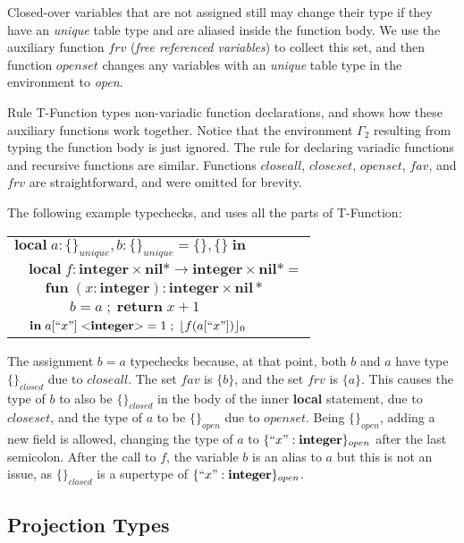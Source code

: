 \documentclass[10pt]{sigplanconf}
\newcommand{\Nil}{\mathbf{nil}}
\newcommand{\Integer}{\mathbf{integer}}
\newcommand{\Void}{\Nil{*}}
\newcommand{\env}{\Gamma}
\begin{document}
Closed-over variables that are not assigned still may
change their type if they have an {\em unique} table type
and are aliased inside the function body. We use the auxiliary
function $frv$ ({\em free referenced variables}) to collect
this set, and then function $openset$ changes any variables
with an {\em unique} table type in the environment to {\em open}.

Rule {\sc T-Function} types non-variadic function declarations,
and shows how these auxiliary functions work together.
Notice that the environment $\env_{2}$ resulting from
typing the function body is just ignored. The rule for
declaring variadic functions and recursive functions are
similar. Functions $closeall$, $closeset$, $openset$, $fav$,
and $frv$ are straightforward, and were omitted for brevity.

The following example typechecks, and uses all the parts of {\sc T-Function}:
{\small
\begin{center}
\begin{tabular}{llll}
\multicolumn{4}{l}{$\mathbf{local} \; a:\{\}_{unique}, b:\{\}_{unique} = \{\}, \{\} \; \mathbf{in}$}\\
& \multicolumn{3}{l}{$\mathbf{local} \; f:\Integer \times \Void \rightarrow \Integer \times \Void =$}\\
& & \multicolumn{2}{l}{$\mathbf{fun} \; (x:\Integer):\Integer \times \Void$}\\
& & & \multicolumn{1}{l}{$b = a \;;\; \mathbf{return} \; x + 1$}\\
& \multicolumn{3}{l}{$\mathbf{in} \; a[``x"] \; {<}\Integer{>} = 1 \;;\; \lfloor f(a[``x"]) \rfloor_0$}\\
\end{tabular}
\end{center}
}

The assignment $b=a$ typechecks because, at that point, 
both $b$ and $a$ have type $\{\}_{closed}$ due to $closeall$.
The set $fav$ is $\{b\}$, and the set $frv$ is $\{a\}$.
This causes the type of $b$ to also be $\{\}_{closed}$
in the body of the inner {\bf local} statement, due to $closeset$, and the type of $a$ to be $\{\}_{open}$ due
to $openset$. Being $\{\}_{open}$, adding a new field
is allowed, changing the type of $a$ to $\{``x": \Integer\}_{open}$ after the last semicolon. After the call to
$f$, the variable $b$ is an alias to $a$ but this is not
an issue, as $\{\}_{closed}$ is a supertype of $\{``x": \Integer\}_{open}$.

\subsection{Projection Types}
\label{sec:projections}
\end{document}

